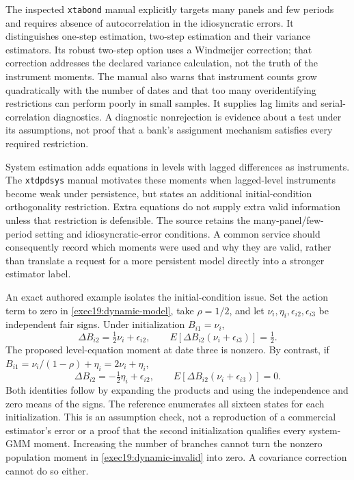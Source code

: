 The inspected \texttt{xtabond} manual explicitly targets many panels and
few periods and requires absence of autocorrelation in the idiosyncratic
errors. It distinguishes one-step estimation, two-step estimation and their
variance estimators. Its robust two-step option uses a Windmeijer correction;
that correction addresses the declared variance calculation, not the truth
of the instrument moments. The manual also warns that instrument counts grow
quadratically with the number of dates and that too many overidentifying
restrictions can perform poorly in small samples. It supplies lag limits
and serial-correlation diagnostics. A diagnostic nonrejection is evidence
about a test under its assumptions, not proof that a bank's assignment
mechanism satisfies every required restriction.\citep{exec19_dynamic_stata_ab}

System estimation adds equations in levels with lagged differences as
instruments. The \texttt{xtdpdsys} manual motivates these moments when
lagged-level instruments become weak under persistence, but states an
additional initial-condition orthogonality restriction. Extra equations do
not supply extra valid information unless that restriction is defensible.
The source retains the many-panel/few-period setting and idiosyncratic-error
conditions. A common service should consequently record which moments were
used and why they are valid, rather than translate a request for a more
persistent model directly into a stronger estimator label.
\citep{exec19_dynamic_stata_system}

An exact authored example isolates the initial-condition issue. Set the
action term to zero in \eqref{exec19:dynamic-model}, take $\rho=1/2$, and
let $\nu_i,\eta_i,\epsilon_{i2},\epsilon_{i3}$ be independent fair
signs. Under initialization $B_{i1}=\nu_i$,
\begin{equation}
 \Delta B_{i2}=\tfrac12\nu_i+\epsilon_{i2},\qquad
 E[\Delta B_{i2}(\nu_i+\epsilon_{i3})]=\tfrac12.
 \label{exec19:dynamic-invalid}
\end{equation}
The proposed level-equation moment at date three is nonzero. By contrast,
if $B_{i1}=\nu_i/(1-\rho)+\eta_i=2\nu_i+\eta_i$,
\begin{equation}
 \Delta B_{i2}=-\tfrac12\eta_i+\epsilon_{i2},\qquad
 E[\Delta B_{i2}(\nu_i+\epsilon_{i3})]=0.
 \label{exec19:dynamic-valid}
\end{equation}
Both identities follow by expanding the products and using the independence
and zero means of the signs. The reference enumerates all sixteen states
for each initialization. This is an assumption check, not a reproduction of
a commercial estimator's error or a proof that the second initialization
qualifies every system-GMM moment. Increasing the number of branches cannot
turn the nonzero population moment in \eqref{exec19:dynamic-invalid} into
zero. A covariance correction cannot do so either.
\citep{exec19_dynamic_reference}

